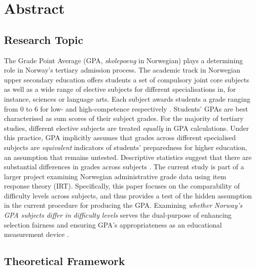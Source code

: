 \section{Abstract}


\subsection{Research Topic}

The Grade Point Average (GPA, \textit{skolepoeng} in Norwegian) plays a determining role in Norway's tertiary admission process. The academic track in Norwegian upper secondary education offers students a set of compulsory joint core subjects as well as a wide range of elective subjects for different specialisations in, for instance, sciences or language arts. Each subject awards students a grade ranging from $0$ to $6$ for low- and high-competence respectively \parencite[][\S 3-5]{lovdata:2006}. Students' GPAs are best characterised as sum scores of their subject grades. For the majority of tertiary studies, different elective subjects are treated \emph{equally} in GPA calculations. Under this practice, GPA implicitly assumes that grades across different specialised subjects are \emph{equivalent} indicators of students' preparedness for higher education, an assumption that remains untested. Descriptive statistics suggest that there are substantial differences in grades across subjects \parencite{udir:2022}. The current study is part of a larger project examining Norwegian administrative grade data using item response theory (IRT). Specifically, this paper focuses on the comparability of difficulty levels across subjects, and thus provides a test of the hidden assumption in the current procedure for producing the GPA. Examining \textit{whether Norway's GPA subjects differ in difficulty levels} serves the dual-purpose of enhancing selection fairness \parencite{camilli:2006} and ensuring GPA's appropriateness as an educational measurement device \parencite{standards:2014}.

\subsection{Theoretical Framework}


